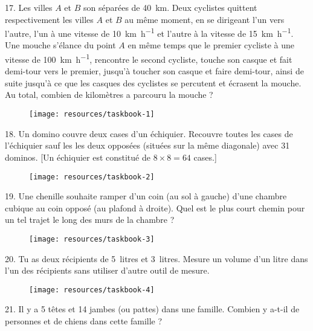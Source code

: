 \begin{problem}{17.}
	Les villes $A$ et $B$ son séparées de \SI{40}{\km}.
	Deux cyclistes quittent respectivement les villes $A$ et $B$ au même moment,
	en se dirigeant l'un vers l'autre, l'un à une vitesse de
	\SI{10}{\km\per\hour} et l'autre à la vitesse de \SI{15}{\km\per\hour}.
	Une mouche s'élance du point $A$ en même temps que le premier cycliste à une
	vitesse de \SI{100}{\km\per\hour}, rencontre le second cycliste,
	touche son casque et fait demi-tour vers le premier, jusqu'à toucher son
	casque et faire demi-tour, ainsi de suite jusqu'à ce que les casques des
	cyclistes se percutent et écrasent la mouche.
	Au total, combien de kilomètres a parcouru la mouche ?
	\begin{figure}
		\texttt{[image: resources/taskbook-1]}
	\end{figure}
\end{problem}

\begin{problem}{18.}
	Un domino couvre deux cases d'un échiquier.
	Recouvre toutes les cases de l'échiquier sauf les les deux opposées
	(situées sur la même diagonale) avec 31 dominos.
	[Un échiquier est constitué de $8 \times 8 = 64$ cases.]
	\begin{figure}
		\texttt{[image: resources/taskbook-2]}
	\end{figure}
\end{problem}

\begin{problem}{19.}
	Une chenille souhaite ramper d'un coin (au sol à gauche) d'une chambre
	cubique au coin opposé (au plafond à droite).
	Quel est le plus court chemin pour un tel trajet le long des murs de
	la chambre ?
	\begin{figure}
		\texttt{[image: resources/taskbook-3]}
	\end{figure}
\end{problem}

\begin{problem}{20.}
	Tu as deux récipients de 5~litres et 3~litres.
	Mesure un volume d'un litre dans l'un des récipients sans utiliser d'autre
	outil de mesure.
	\begin{figure}
		\texttt{[image: resources/taskbook-4]}
	\end{figure}
\end{problem}

\begin{problem}{21.}
	Il y a 5 têtes et 14 jambes (ou pattes) dans une famille.
	Combien y a-t-il de personnes et de chiens dans cette famille ?
\end{problem}

